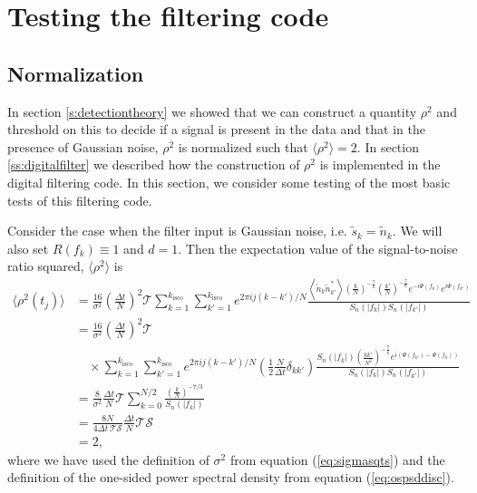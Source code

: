 \section{Testing the filtering code}
\label{s:testing}

\subsection{Normalization}
\label{ss:normalization}

In section \ref{s:detectiontheory} we showed that we can construct a quantity
$\rho^2$ and threshold on this to decide if a signal is present in the data
and that in the presence of Gaussian noise, $\rho^2$ is normalized such that 
$\langle\rho^2\rangle = 2$.  In section \ref{ss:digitalfilter} we described
how the construction of $\rho^2$ is implemented in the digital filtering code.
In this section, we consider some testing of the most basic tests of this
filtering code.

Consider the case when the filter input is Gaussian noise, i.e. $\tilde{s}_k =
\tilde{n}_k$.  We will also set $R(f_k)\equiv 1$ and $d = 1$.  Then the expectation
value of the signal-to-noise ratio squared, $\langle \rho^2
\rangle$ is
\begin{equation}
\begin{split}
\langle \rho^2(t_j) \rangle &=
\frac{16}{\sigma^2}\left(\frac{\Delta t}{N}\right)^2 \mathcal{T}
  \sum_{k=1}^{k_\mathrm{isco}} \sum_{k'=1}^{k_\mathrm{isco}} 
  e^{2\pi ij(k-k')/N} 
  \frac{\left\langle \tilde{n}_k \tilde{n}_{k'}^{\ast} \right\rangle 
        \left(\frac{k}{N}\right)^{-\frac{7}{6}} \left(\frac{k'}{N}\right)^{-\frac{7}{6}}
        e^{-i\Psi(f_k)} e^{i\Psi(f_{k'})}}
       {S_n\left(\left|f_k\right|\right)S_n\left(\left|f_{k'}\right|\right)} \\
&= 
\frac{16}{\sigma^2}\left(\frac{\Delta t}{N}\right)^2 \mathcal{T} \\
&\quad\times
  \sum_{k=1}^{k_\mathrm{isco}} \sum_{k'=1}^{k_\mathrm{isco}} 
  e^{2\pi ij(k-k')/N} \left(\frac{1}{2} \frac{N}{\Delta t}  \delta_{kk'} \right) 
  \frac{ S_n\left(\left|f_k\right|\right)
        \left(\frac{kk'}{N^2}\right)^{-\frac{7}{6}}
        e^{i ( \Psi(f_{k'}) - \Psi(f_k) )}}
       {S_n\left(\left|f_k\right|\right)S_n\left(\left|f_{k'}\right|\right)} \\
&= 
\frac{8}{\sigma^2} \frac{\Delta t}{N} \mathcal{T}
  \sum_{k=0}^{N/2}
  \frac{ \left(\frac{k}{N}\right)^{-7/3} }
       {S_n\left(\left|f_k\right|\right)} \\
&= 
\frac{8N}{4\Delta t\, \mathcal{T}\mathcal{S}} \frac{\Delta t}{N} \mathcal{T} \mathcal{S} \\
&= 2,
\label{eq:filternorm}
\end{split}
\end{equation}
where we have used the definition of $\sigma^2$ from equation
(\ref{eq:sigmasqts}) and the definition of the one-sided power spectral
density from equation (\ref{eq:ospsddisc}).

